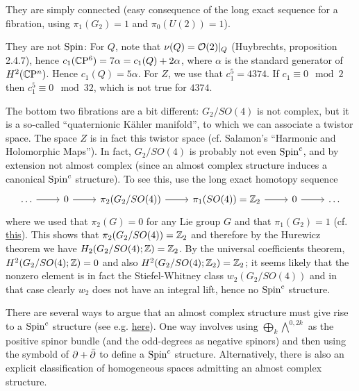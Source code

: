 \documentclass{scrartcl}
\begin{document}
They are simply connected (easy consequence of the long exact sequence for a fibration, using $\pi_1(G_2)=1$ and $\pi_0(U(2))=1$). 

\medskip

They are not $\operatorname{Spin}$: For $Q$, note that $\nu(Q)=\mathcal{O}(2)|_Q$ (Huybrechts, proposition 2.4.7), hence $c_1(\mathbb{C}\mathrm{P}^6)=7\alpha=c_1(Q)+2\alpha$, where $\alpha$ is the standard generator of $H^2(\mathbb{C}\mathrm{P}^n)$. Hence $c_1(Q)=5\alpha$. For $Z$, we use that $c_1^5=4374$. If $c_1\equiv 0\mod 2$ then $c_1^5\equiv 0\mod 32$, which is not true for $4374$.

\medskip

The bottom two fibrations are a bit different: $G_2/SO(4)$ is not complex, but it is a so-called ``quaternionic K\"{a}hler manifold'', to which we can associate a twistor space. The space $Z$ is in fact this twistor space (cf. Salamon's ``Harmonic and Holomorphic Maps''). In fact, $G_2/SO(4)$ is probably not even $\operatorname{Spin}^c$, and by extension not almost complex (since an almost complex structure induces a canonical $\operatorname{Spin}^c$ structure). To see this, use the long exact homotopy sequence
\begin{equation*}
	\begin{tikzcd}
		\dots \ar[r] & 0 \ar[r] & \pi_2(G_2/SO(4)) \ar[r] & \pi_1(SO(4))=\Z_2 \ar[r] & 0 \ar[r] & \dots
	\end{tikzcd}
\end{equation*}
where we used that $\pi_2(G)=0$ for any Lie group $G$ and that $\pi_1(G_2)=1$ (cf. \href{https://mathoverflow.net/questions/8957/homotopy-groups-of-lie-groups}{this}). This shows that $\pi_2(G_2/SO(4))=\mathbb{Z}_2$ and therefore by the Hurewicz theorem we have $H_2(G_2/SO(4);\mathbb{Z})=\mathbb{Z}_2$. By the universal coefficients theorem, $H^2(G_2/SO(4);\mathbb{Z})=0$ and also $H^2(G_2/SO(4);\mathbb{Z}_2)=\mathbb{Z}_2$; it seems likely that the nonzero element is in fact the Stiefel-Whitney class $w_2(G_2/SO(4))$ and in that case clearly $w_2$ does not have an integral lift, hence no $\operatorname{Spin}^c$ structure.

\medskip

There are several ways to argue that an almost complex structure must give rise to a $\operatorname{Spin}^c$ structure (see e.g. \href{https://mathoverflow.net/questions/241495/spinc-structures-on-manifolds-with-almost-complex-structure}{here}). One way involves using $\bigoplus_k \bigwedge^{0,2k}$ as the positive spinor bundle (and the odd-degrees as negative spinors) and then using the symbold of $\partial+\bar{\partial}$ to define a $\operatorname{Spin}^c$ structure. Alternatively, there is also an explicit classification of homogeneous spaces admitting an almost complex structure. 
\end{document}
